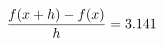 \documentclass[preview]{standalone}
\begin{document}
\begin{align*}
\special{dvisvgm:raw <g id='unique000'>}\frac{f(x+h)-f(x)}{h} = 3.141\special{dvisvgm:raw </g>}
\end{align*}
\end{document}

